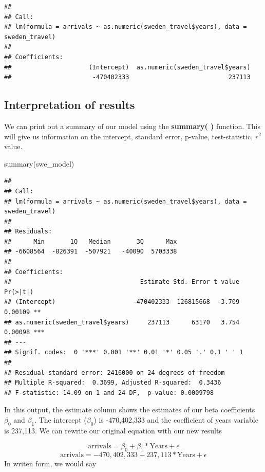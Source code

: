 \documentclass[
]{book}
\newenvironment{Shaded}{\begin{snugshade}}{\end{snugshade}}
\newcommand{\FunctionTok}[1]{\textcolor[rgb]{0.00,0.00,0.00}{#1}}
\newcommand{\NormalTok}[1]{#1}
\begin{document}
\begin{verbatim}
## 
## Call:
## lm(formula = arrivals ~ as.numeric(sweden_travel$years), data = sweden_travel)
## 
## Coefficients:
##                     (Intercept)  as.numeric(sweden_travel$years)  
##                      -470402333                           237113
\end{verbatim}

\hypertarget{interpretation-of-results}{%
\subsection{Interpretation of results}\label{interpretation-of-results}}

We can print out a summary of our model using the \textbf{summary( )} function. This will give us information on the intercept, standard error, p-value, test-statistic, \(r^2\) value.

\begin{Shaded}
\begin{Highlighting}[]
\FunctionTok{summary}\NormalTok{(swe\_model)}
\end{Highlighting}
\end{Shaded}

\begin{verbatim}
## 
## Call:
## lm(formula = arrivals ~ as.numeric(sweden_travel$years), data = sweden_travel)
## 
## Residuals:
##      Min       1Q   Median       3Q      Max 
## -6608564  -826391  -507921   -40090  5703338 
## 
## Coefficients:
##                                   Estimate Std. Error t value Pr(>|t|)    
## (Intercept)                     -470402333  126815668  -3.709  0.00109 ** 
## as.numeric(sweden_travel$years)     237113      63170   3.754  0.00098 ***
## ---
## Signif. codes:  0 '***' 0.001 '**' 0.01 '*' 0.05 '.' 0.1 ' ' 1
## 
## Residual standard error: 2416000 on 24 degrees of freedom
## Multiple R-squared:  0.3699, Adjusted R-squared:  0.3436 
## F-statistic: 14.09 on 1 and 24 DF,  p-value: 0.0009798
\end{verbatim}

In this output, the estimate column shows the estimates of our beta coefficients \(\beta_0\) and \(\beta_1\).
The intercept (\(\beta_0\)) is -470,402,333 and the coefficient of years variable is 237,113. We can rewrite our original equation with our new results

\[\text{arrivals} = \beta_{0} + \beta_{1}*\text{Years} + \epsilon\]
\[\text{arrivals} = -470,402,333 + 237,113*\text{Years} + \epsilon\]
In writen form, we would say
\end{document}
